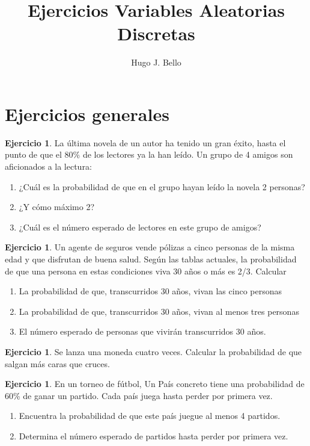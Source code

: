 \documentclass[]{article}
\title{Ejercicios Variables Aleatorias Discretas}
\author{Hugo J. Bello}
\date{}
\providecommand{\tightlist}{%
  \setlength{\itemsep}{0pt}\setlength{\parskip}{0pt}}
\theoremstyle{plain}
\theoremstyle{definition}
\newtheorem{exercise}[theorem]{Ejercicio}
\theoremstyle{definition} %
\begin{document}
\maketitle
\section{Ejercicios generales}
\begin{exercise}
    La última novela de un autor ha tenido un gran éxito, hasta el punto
  de que el 80\% de los lectores ya la han leído. Un grupo de 4 amigos
  son aficionados a la lectura:

  \begin{enumerate}
  \def\labelenumii{\arabic{enumii}.}
  \tightlist
  \item
    ¿Cuál es la probabilidad de que en el grupo hayan leído la novela 2
    personas?
  \item
    ¿Y cómo máximo 2?
  \item ¿Cuál es el número esperado de lectores en este grupo de amigos?
  \end{enumerate}

\end{exercise}
\begin{exercise}

  Un agente de seguros vende pólizas a cinco personas de la misma edad y
  que disfrutan de buena salud. Según las tablas actuales, la
  probabilidad de que una persona en estas condiciones viva 30 años o
  más es 2/3. Calcular 

  \begin{enumerate}
  \def\labelenumii{\arabic{enumii}.}
  \tightlist
  \item La probabilidad de que, transcurridos 30 años,
  vivan las cinco personas
  \item
  La probabilidad de que, transcurridos 30 años,
  vivan al menos tres personas
  \item El número esperado de personas que vivirán transcurridos 30 años.

  
  \end{enumerate}

\end{exercise}
\begin{exercise}

  Se lanza una moneda cuatro veces. Calcular la probabilidad de que
  salgan más caras que cruces.

\end{exercise}
\begin{exercise}

  En un torneo de fútbol, Un País concreto tiene una probabilidad de
  60\% de ganar un partido.  Cada país juega hasta perder por primera vez.
  \begin{enumerate}
    \item Encuentra la probabilidad de que este país juegue al menos 4
    partidos.
    \item Determina el número esperado de partidos hasta perder por primera vez.
  \end{enumerate}
  

\end{exercise}
\end{document}

